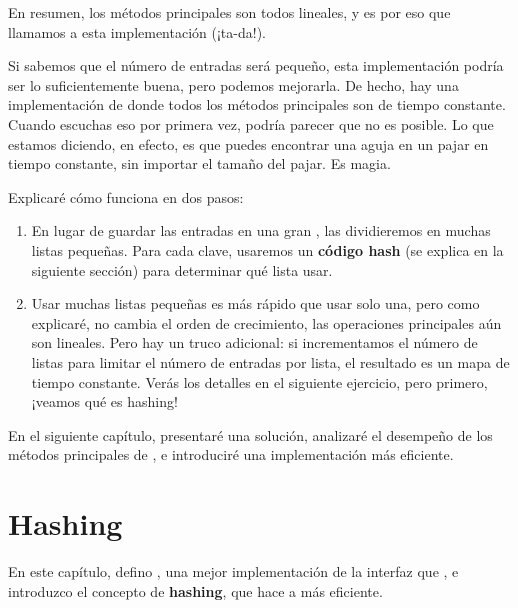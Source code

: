 \documentclass[12pt]{book}
\theoremstyle{exercise}
\begin{document}

En resumen, los métodos principales son todos lineales, y es por eso que
llamamos a esta implementación  (¡ta-da!).

Si sabemos que el número de entradas será pequeño, esta implementación
podría ser lo suficientemente buena, pero podemos mejorarla. De hecho,
hay una implementación de  donde todos los métodos principales
son de tiempo constante. Cuando escuchas eso por primera vez, podría parecer
que no es posible. Lo que estamos diciendo, en efecto, es que puedes encontrar
una aguja en un pajar en tiempo constante, sin importar el tamaño del pajar.
Es magia.


Explicaré cómo funciona en dos pasos:

\begin{enumerate}

\item
  En lugar de guardar las entradas en una gran , las dividieremos
  en muchas listas pequeñas. Para cada clave, usaremos un \textbf{código
  hash} (se explica en la siguiente sección) para determinar qué lista usar.

\item
  Usar muchas listas pequeñas es más rápido que usar solo una, pero como
  explicaré, no cambia el orden de crecimiento, las operaciones principales
  aún son lineales. Pero hay un truco adicional: si incrementamos el número
  de listas para limitar el número de entradas por lista, el resultado es
  un mapa de tiempo constante. Verás los detalles en el siguiente ejercicio,
  pero primero, ¡veamos qué es hashing!

\end{enumerate}



En el siguiente capítulo, presentaré una solución, analizaré el desempeño
de los métodos principales de , e introduciré una implementación
más eficiente.


\chapter{Hashing}
\label{cs-maps-hashing-readme}

En este capítulo, defino
, una mejor implementación de la interfaz 
que , e introduzco el concepto de
\textbf{hashing}, que hace a  más eficiente.
\end{document}
